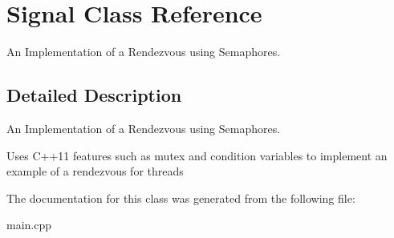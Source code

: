 \hypertarget{classSignal}{}\section{Signal Class Reference}
\label{classSignal}


An Implementation of a Rendezvous using Semaphores.  




\subsection{Detailed Description}
An Implementation of a Rendezvous using Semaphores. 

Uses C++11 features such as mutex and condition variables to implement an example of a rendezvous for threads 

The documentation for this class was generated from the following file\+:\begin{DoxyCompactItemize}
\item 
main.\+cpp\end{DoxyCompactItemize}
